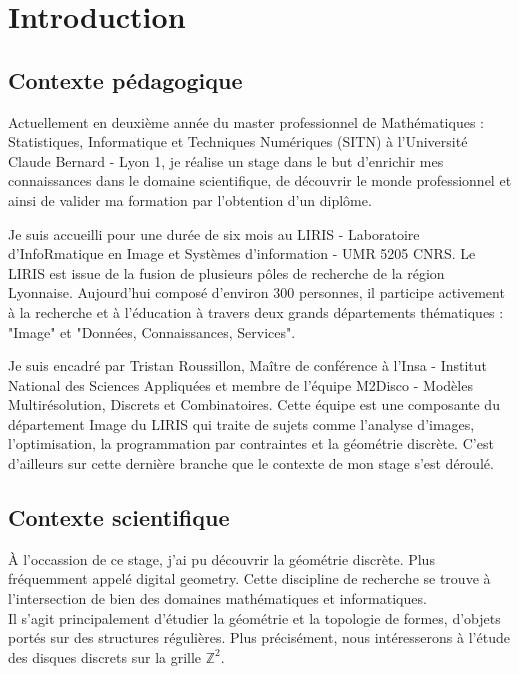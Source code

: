 \section{Introduction}

\subsection{Contexte pédagogique}

Actuellement en deuxième année du master professionnel de Mathématiques : Statistiques, Informatique et Techniques Numériques (SITN) à l’Université Claude Bernard - Lyon 1, je réalise un stage dans le but d'enrichir mes connaissances dans le domaine scientifique, de découvrir le monde professionnel et ainsi de valider ma formation par l'obtention d'un diplôme.\newline

Je suis accueilli pour une durée de six mois au LIRIS - Laboratoire d'InfoRmatique en Image et Systèmes d'information - UMR 5205 CNRS. Le LIRIS est issue de la fusion de plusieurs pôles de recherche de la région Lyonnaise. Aujourd'hui composé d'environ 300 personnes, il participe activement à la recherche et à l'éducation à travers deux grands départements thématiques : "Image" et "Données, Connaissances, Services".\newline

Je suis encadré par Tristan Roussillon, Maître de conférence à l'Insa - Institut National des Sciences Appliquées et membre de l'équipe M2Disco - Modèles Multirésolution, Discrets et Combinatoires. Cette équipe est une composante du département Image du LIRIS qui traite de sujets comme l'analyse d'images, l'optimisation, la programmation par contraintes et la géométrie discrète. C'est d'ailleurs sur cette dernière branche que le contexte de mon stage s'est déroulé.

\subsection{Contexte scientifique}

À l'occassion de ce stage, j'ai pu découvrir la géométrie discrète. Plus fréquemment appelé digital geometry. Cette discipline de recherche se trouve à l'intersection de bien des domaines mathématiques et informatiques.\\
 
Il s'agit principalement d'étudier la géométrie et la topologie de formes, d'objets portés sur des structures régulières. Plus précisément, nous intéresserons à l'étude des disques discrets sur la grille $\mathbb{Z}^{2}$. 
